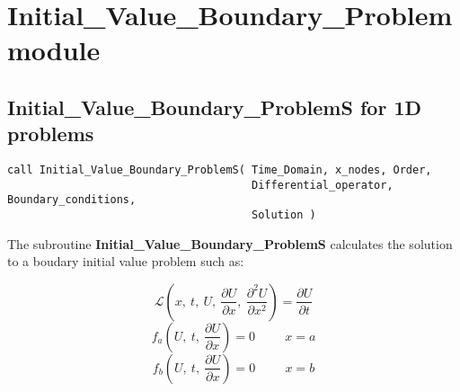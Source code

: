 \newpage

\par\vspace{\baselineskip}
\lstset{language=Fortran}



\newpage







\section{Initial\_Value\_Boundary\_Problem  module}

\subsection*{Initial\_Value\_Boundary\_ProblemS for 1D problems}

\lstset{language=Fortran}
\begin{lstlisting}[frame=trBL]
call Initial_Value_Boundary_ProblemS( Time_Domain, x_nodes, Order, 
                                      Differential_operator, Boundary_conditions,  
                                      Solution )  
                                        \end{lstlisting}   

The subroutine \textbf{Initial\_Value\_Boundary\_ProblemS} calculates the solution to a boudary initial value problem such as:

\begin{equation*}
\mathscr{L}\left(x,\ t,\ U, \ \frac{\partial U}{\partial x}, \ \frac{\partial^2 U}{\partial x^2} \right) = \frac{\partial U}{\partial t}
\end{equation*}
\begin{equation*}
f_a\left(U,\ t,\ \frac{\partial U}{\partial x}\right)=0 \hspace{1cm} x=a
\end{equation*}
\begin{equation*}
f_b\left(U, \ t, \ \frac{\partial U}{\partial x}\right)=0 \hspace{1cm} x=b
\end{equation*}


